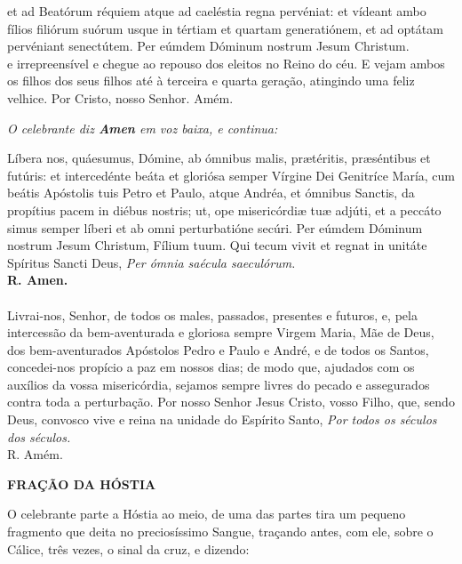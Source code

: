 \begin{multicols}{2}
	\noindent et ad Beatórum réquiem atque ad caeléstia regna pervéniat: et vídeant ambo fílios filiórum suórum usque in tértiam et quartam generatiónem, et ad optátam pervéniant senectútem. Per eúmdem Dóminum nostrum Jesum Christum.
	\\e irrepreensível e chegue ao repouso dos eleitos no Reino do céu. E vejam ambos os filhos dos seus filhos até à terceira e quarta geração, atingindo uma feliz velhice. Por Cristo, nosso Senhor. Amém.
\end{multicols}
\begin{flushleft}
	\textit{O celebrante diz \textbf{Amen} em voz baixa, e continua:}
\end{flushleft}
\begin{multicols}{2}
	\noindent Líbera nos, quáesumus, Dómine, ab ómnibus malis, prætéritis, præséntibus et futúris: et intercedénte beáta et gloriósa semper Vírgine Dei Genitríce María, cum beátis Apóstolis tuis Petro et Paulo, atque Andréa, et ómnibus Sanctis, da propítius pacem in diébus nostris; ut, ope misericórdiæ tuæ adjúti, et a peccáto simus semper líberi et ab omni perturbatióne secúri. Per eúmdem Dóminum nostrum Jesum Christum, Fílium tuum. Qui tecum vivit et regnat in unitáte Spíritus Sancti Deus, \textit{Per ómnia saécula saeculórum.}
	\\ \textbf{R. Amen. }
	\\
	\\ Livrai-nos, Senhor, de todos os males, passados, presentes e futuros, e, pela intercessão da bem-aventurada e gloriosa sempre Virgem Maria, Mãe de Deus, dos bem-aventurados Apóstolos Pedro e Paulo e André, e de todos os Santos, concedei-nos propício a paz em nossos dias; de modo que, ajudados com os auxílios da vossa misericórdia, sejamos sempre livres do pecado e assegurados contra toda a perturbação. Por nosso Senhor Jesus Cristo, vosso Filho, que, sendo Deus, convosco vive e reina na unidade do Espírito Santo, \textit{Por todos os séculos dos séculos. }
	\\ R. Amém. 
\end{multicols}
\begin{center}
	\textbf{FRAÇÃO DA HÓSTIA}
\end{center}
\begin{flushleft}
	O celebrante parte a Hóstia ao meio, de uma das partes tira um pequeno fragmento que deita no preciosíssimo Sangue, traçando antes, com ele, sobre o Cálice, três vezes, o sinal da cruz, e
	dizendo:
\end{flushleft}
